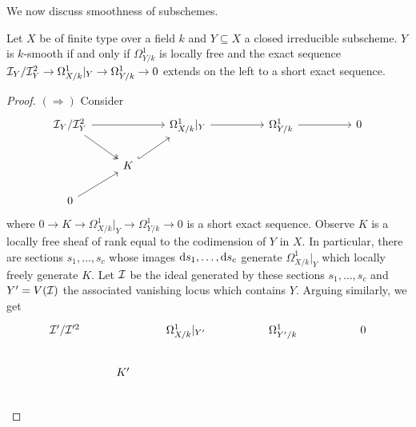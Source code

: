We now discuss smoothness of subschemes. 
\begin{proposition}\label{prop: smoothness of closed subschemes}
    Let $X$ be of finite type over a field $k$ and $Y\subseteq X$ a closed irreducible subscheme. $Y$ is $k$-smooth if and only if $\Omega_{Y/k}^{1}$ is locally free and the exact sequence $\Ical_{Y}/\Ical_{Y}^{2}\to\Omega_{X/k}^{1}|_{Y}\to\Omega_{Y/k}^{1}\to 0$ extends on the left to a short exact sequence. 
\end{proposition}
\begin{proof}
    $(\Rightarrow)$ Consider 
    $$%
    \begin{tikzcd}
        {\Ical_{Y}/\Ical_{Y}^{2}} && {\Omega^{1}_{X/k}|_{Y}} && {\Omega^{1}_{Y/k}} && 0 \\
        & K \\
        0
        \arrow[from=1-1, to=1-3]
        \arrow[two heads, from=1-1, to=2-2]
        \arrow[from=1-3, to=1-5]
        \arrow[from=1-5, to=1-7]
        \arrow[hook, from=2-2, to=1-3]
        \arrow[from=3-1, to=2-2]
    \end{tikzcd}$$
    where $0\to K\to \Omega_{X/k}^{1}|_{Y}\to\Omega^{1}_{Y/k}\to0$ is a short exact sequence. Observe $K$ is a locally free sheaf of rank equal to the codimension of $Y$ in $X$. In particular, there are sections $s_{1},\dots,s_{c}$ whose images $\dform s_{1},\dots,\dform s_{c}$ generate $\Omega^{1}_{X/k}|_{Y}$ which locally freely generate $K$. Let $\Ical$ be the ideal generated by these sections $s_{1},\dots,s_{c}$ and $Y'=V(\Ical)$ the associated vanishing locus which contains $Y$. Arguing similarly, we get 
    $$%
    \begin{tikzcd}
        {\Ical'/\Ical'^{2}} && {\Omega^{1}_{X/k}|_{Y'}} && {\Omega^{1}_{Y'/k}} && 0 \\
        & {K'} \\

\end{tikzcd}$$
\end{proof}
